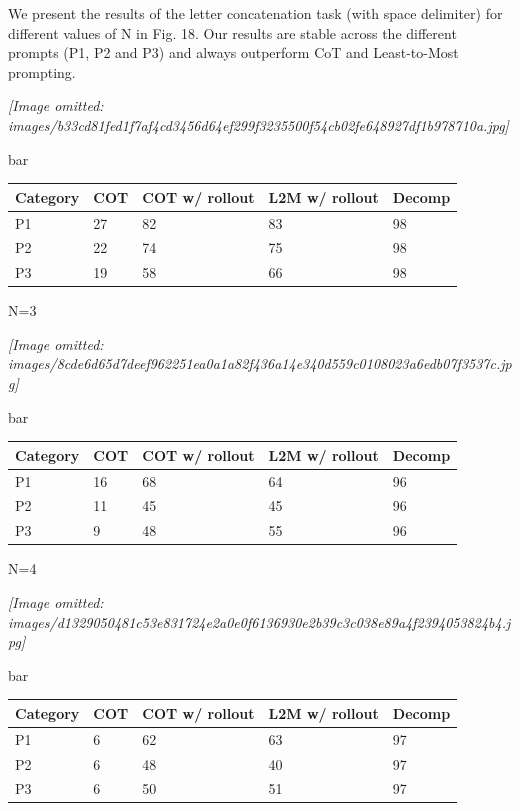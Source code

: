 \documentclass[
]{article}
\newcounter{none} %
\begin{document}
We present the results of the letter concatenation task (with space
delimiter) for different values of N in Fig. 18. Our results are stable
across the different prompts (P1, P2 and P3) and always outperform CoT
and Least-to-Most prompting.

\textit{[Image omitted: images/b33cd81fed1f7af4cd3456d64ef299f3235500f54cb02fe648927df1b978710a.jpg]}

bar

{\def\LTcaptype{none} %
\begin{longtable}[]{@{}lllll@{}}
\toprule\noalign{}
Category & COT & COT w/ rollout & L2M w/ rollout & Decomp \\
\midrule\noalign{}
\endhead
\bottomrule\noalign{}
\endlastfoot
P1 & 27 & 82 & 83 & 98 \\
P2 & 22 & 74 & 75 & 98 \\
P3 & 19 & 58 & 66 & 98 \\
\end{longtable}
}

N=3

\textit{[Image omitted: images/8cde6d65d7deef962251ea0a1a82f436a14e340d559c0108023a6edb07f3537c.jpg]}

bar

{\def\LTcaptype{none} %
\begin{longtable}[]{@{}lllll@{}}
\toprule\noalign{}
Category & COT & COT w/ rollout & L2M w/ rollout & Decomp \\
\midrule\noalign{}
\endhead
\bottomrule\noalign{}
\endlastfoot
P1 & 16 & 68 & 64 & 96 \\
P2 & 11 & 45 & 45 & 96 \\
P3 & 9 & 48 & 55 & 96 \\
\end{longtable}
}

N=4

\textit{[Image omitted: images/d1329050481c53e831724e2a0e0f6136930e2b39c3c038e89a4f2394053824b4.jpg]}

bar

{\def\LTcaptype{none} %
\begin{longtable}[]{@{}lllll@{}}
\toprule\noalign{}
Category & COT & COT w/ rollout & L2M w/ rollout & Decomp \\
\midrule\noalign{}
\endhead
\bottomrule\noalign{}
\endlastfoot
P1 & 6 & 62 & 63 & 97 \\
P2 & 6 & 48 & 40 & 97 \\
P3 & 6 & 50 & 51 & 97 \\
\end{longtable}
}
\end{document}
